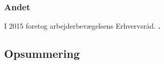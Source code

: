 \subsubsection{Andet}

I 2015 foretog arbejderbevægelsens Erhvervsråd. \textbf{\parencite{Kirk2015}.}


\subsection{Opsummering}


